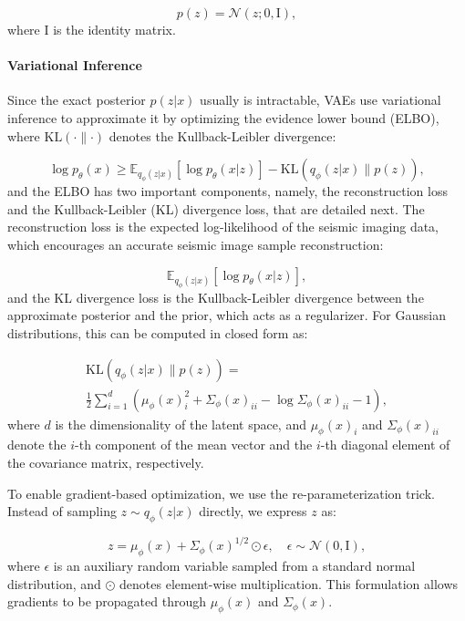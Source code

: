\documentclass{ieeeaccess}
\begin{document}
\begin{equation}
p(z) = \mathcal{N}(z; 0, \mathrm{I}),
\end{equation}
where $\mathrm{I}$ is the identity matrix.

\paragraph{Variational Inference} 
Since the exact posterior $p(z | x)$ usually is intractable, VAEs use variational inference to approximate it by optimizing the evidence lower bound (ELBO), where $\text{KL}(\cdot \parallel \cdot)$ denotes the Kullback-Leibler divergence:

\begin{equation}
\log p_\theta(x) \geq \mathbb{E}_{q_\phi(z | x)} \left[ \log p_\theta(x | z) \right] - \text{KL}(q_\phi(z | x) \parallel p(z)),
\end{equation}
and the ELBO has two important components, namely, the reconstruction loss and the Kullback-Leibler (KL) divergence loss, that are detailed next. The reconstruction loss is the expected log-likelihood of the seismic imaging data, which encourages an accurate seismic image sample reconstruction:

\begin{equation}
\mathbb{E}_{q_\phi(z | x)} \left[ \log p_\theta(x | z) \right],
\end{equation}
and the KL divergence loss is the Kullback-Leibler divergence between the approximate posterior and the prior, which acts as a regularizer. For Gaussian distributions, this can be computed in closed form as:

\begin{equation}
\begin{aligned}
\text{KL}(q_\phi(z | x) \parallel p(z))
=  \\
\frac{1}{2} \sum_{i=1}^{d} \left( \mu_\phi(x)_i^2 + \Sigma_\phi(x)_{ii} - \log \Sigma_\phi(x)_{ii} - 1 \right),
\end{aligned}
\end{equation}
where $d$ is the dimensionality of the latent space, and $\mu_\phi(x)_i$ and $\Sigma_\phi(x)_{ii}$ denote the $i$-th component of the mean vector and the $i$-th diagonal element of the covariance matrix, respectively.

To enable gradient-based optimization, we use the re-parameterization trick. Instead of sampling $z \sim q_\phi(z | x)$ directly, we express $z$ as:

\begin{equation}
z = \mu_\phi(x) + \Sigma_\phi(x)^{1/2} \odot \epsilon, \quad \epsilon \sim \mathcal{N}(0, \mathrm{I}),
\end{equation}
where $\epsilon$ is an auxiliary random variable sampled from a standard normal distribution, and $\odot$ denotes element-wise multiplication. This formulation allows gradients to be propagated through $\mu_\phi(x)$ and $\Sigma_\phi(x)$.
\end{document}

